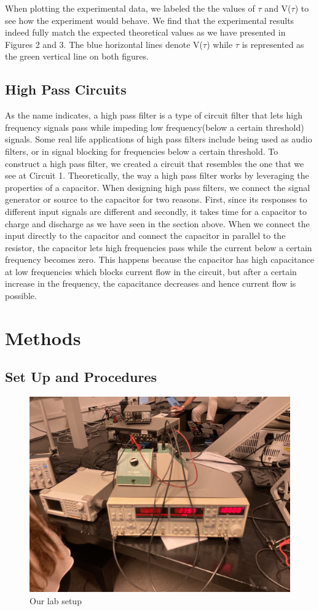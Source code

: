 \documentclass[twocolumn]{article}\usepackage[english]{babel}
\begin{document}
When plotting the experimental data, we labeled the the values of $\tau$ and V($\tau$) to see how the experiment would behave. We find that the experimental results indeed fully match the expected theoretical values as we have presented in Figures 2 and 3. The blue horizontal lines denote V($\tau$) while $\tau$ is represented as the green vertical line on both figures.   
\subsection{High Pass Circuits}
As the name indicates, a high pass filter is a type of circuit filter that lets high frequency signals pass while impeding low frequency(below a certain threshold) signals. Some real life applications of high pass filters include being used as audio filters, or in signal blocking for frequencies below a certain threshold. To construct a high pass filter, we created a circuit that resembles the one that we see at Circuit 1. Theoretically, the way a high pass filter works by leveraging the properties of a capacitor. When designing high pass filters, we connect the signal generator or source to the capacitor for two reasons. First, since its responses to different input signals are different and secondly, it takes time for a capacitor to charge and discharge as we have seen in the section above. 
When we connect the input directly to the capacitor and connect the capacitor in parallel to the resistor, the capacitor lets high frequencies pass while the current below a certain frequency becomes zero. This happens because the capacitor has high capacitance at low frequencies which blocks current flow in the circuit, but after a certain increase in the frequency, the capacitance decreases and hence current flow is possible.
\section{Methods}
\subsection{Set Up and Procedures}
\begin{figure}
  \includegraphics[width=\linewidth]{images/lab/setup.JPEG}
  \caption{Our lab setup}
  \label{fig:LAB_SETUP}
\end{figure}
\end{document}

